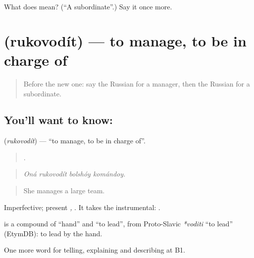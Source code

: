 \begin{tcolorbox}[breakable,colback=teal!4,colframe=teal!35!black,title={Before you move on}]
What does  mean? (\textquotedblleft{}A subordinate\textquotedblright{}.) Say it once more.
\end{tcolorbox}
\section[\texorpdfstring{\ru{руководить} (rukovodít)}{руководить (rukovodít)}]{ (rukovodít) — to manage, to be in charge of}

\label{lesson:RU-C357-rukovodit}



\begin{quote}
Before the new one: say the Russian for a manager, then the Russian for a subordinate.
\end{quote}

\subsection*{You'll want to know: }
\textbf{} (\emph{rukovodít}) — \textquotedblleft{}to manage, to be in charge of\textquotedblright{}.

\begin{quote}
   .
\end{quote}

\begin{quote}
\emph{Oná rukovodít bolshóy komándoy.}
\end{quote}

\begin{quote}
She manages a large team.
\end{quote}

Imperfective; present \emph{, }. It takes the instrumental: \emph{ }.

\begin{cousinweb}
\textbf{} is a compound of \emph{} \textquotedblleft{}hand\textquotedblright{} and \emph{} \textquotedblleft{}to lead\textquotedblright{}, from Proto-Slavic \emph{*voditi} \textquotedblleft{}to lead\textquotedblright{} (EtymDB): to lead by the hand.
\end{cousinweb}

\begin{grammarlens}[title={What you've built}]
One more word for telling, explaining and describing at B1.
\end{grammarlens}

